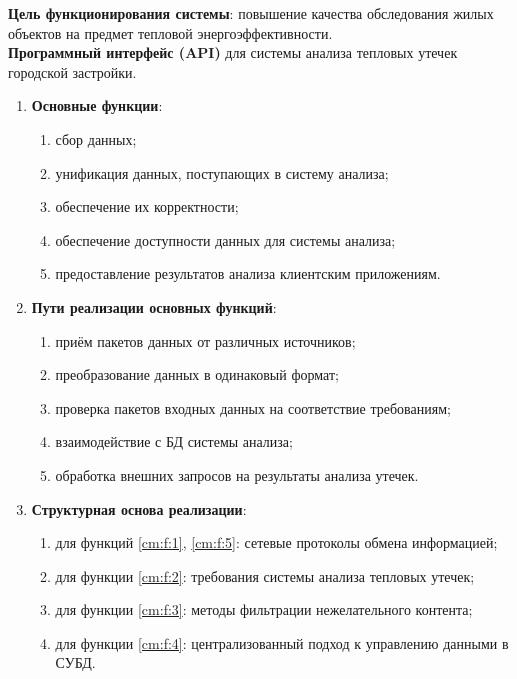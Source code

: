 \textbf{Цель функционирования системы}: повышение качества обследования жилых объектов на предмет тепловой энергоэффективности. \\
 
\textbf{Программный интерфейс (API)} для системы анализа тепловых утечек городской застройки.

\begin{enumerate}
 
	\item \textbf{Основные функции}:

	\begin{enumerate}
		\item сбор данных; \label{cm:f:1}
		\item унификация данных, поступающих в систему анализа; \label{cm:f:2}
		\item обеспечение их корректности; \label{cm:f:3}
		\item обеспечение доступности данных для системы анализа; \label{cm:f:4}
		\item предоставление результатов анализа клиентским приложениям. \label{cm:f:5}
	\end{enumerate}

	\item \textbf{Пути реализации основных функций}:

	\begin{enumerate}
		\item приём пакетов данных от различных источников;
		\item преобразование данных в одинаковый формат;
		\item проверка пакетов входных данных на соответствие требованиям;
		\item взаимодействие с БД системы анализа;
		\item обработка внешних запросов на результаты анализа утечек.
	\end{enumerate}

	\item \textbf{Структурная основа реализации}:

	\begin{enumerate}
		\item для функций \ref{cm:f:1}, \ref{cm:f:5}: сетевые протоколы обмена информацией;
		\item для функции \ref{cm:f:2}: требования системы анализа тепловых утечек;
		\item для функции \ref{cm:f:3}: методы фильтрации нежелательного контента;
		\item для функции \ref{cm:f:4}: централизованный подход к управлению данными в СУБД.
	\end{enumerate}


\end{enumerate}
